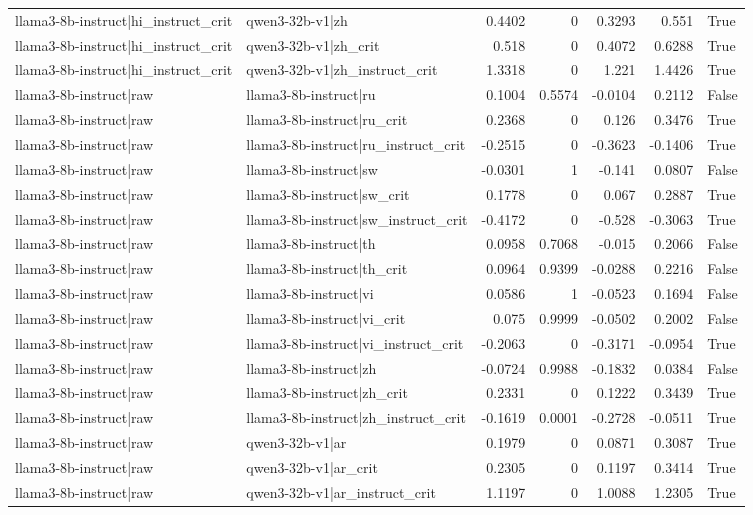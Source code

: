\begin{table}
\begin{tabular}{l l r r r r l}
llama3-8b-instruct|hi_instruct_crit & qwen3-32b-v1|zh & 0.4402 & 0 & 0.3293 & 0.551 & True \\
llama3-8b-instruct|hi_instruct_crit & qwen3-32b-v1|zh_crit & 0.518 & 0 & 0.4072 & 0.6288 & True \\
llama3-8b-instruct|hi_instruct_crit & qwen3-32b-v1|zh_instruct_crit & 1.3318 & 0 & 1.221 & 1.4426 & True \\
llama3-8b-instruct|raw & llama3-8b-instruct|ru & 0.1004 & 0.5574 & -0.0104 & 0.2112 & False \\
llama3-8b-instruct|raw & llama3-8b-instruct|ru_crit & 0.2368 & 0 & 0.126 & 0.3476 & True \\
llama3-8b-instruct|raw & llama3-8b-instruct|ru_instruct_crit & -0.2515 & 0 & -0.3623 & -0.1406 & True \\
llama3-8b-instruct|raw & llama3-8b-instruct|sw & -0.0301 & 1 & -0.141 & 0.0807 & False \\
llama3-8b-instruct|raw & llama3-8b-instruct|sw_crit & 0.1778 & 0 & 0.067 & 0.2887 & True \\
llama3-8b-instruct|raw & llama3-8b-instruct|sw_instruct_crit & -0.4172 & 0 & -0.528 & -0.3063 & True \\
llama3-8b-instruct|raw & llama3-8b-instruct|th & 0.0958 & 0.7068 & -0.015 & 0.2066 & False \\
llama3-8b-instruct|raw & llama3-8b-instruct|th_crit & 0.0964 & 0.9399 & -0.0288 & 0.2216 & False \\
llama3-8b-instruct|raw & llama3-8b-instruct|vi & 0.0586 & 1 & -0.0523 & 0.1694 & False \\
llama3-8b-instruct|raw & llama3-8b-instruct|vi_crit & 0.075 & 0.9999 & -0.0502 & 0.2002 & False \\
llama3-8b-instruct|raw & llama3-8b-instruct|vi_instruct_crit & -0.2063 & 0 & -0.3171 & -0.0954 & True \\
llama3-8b-instruct|raw & llama3-8b-instruct|zh & -0.0724 & 0.9988 & -0.1832 & 0.0384 & False \\
llama3-8b-instruct|raw & llama3-8b-instruct|zh_crit & 0.2331 & 0 & 0.1222 & 0.3439 & True \\
llama3-8b-instruct|raw & llama3-8b-instruct|zh_instruct_crit & -0.1619 & 0.0001 & -0.2728 & -0.0511 & True \\
llama3-8b-instruct|raw & qwen3-32b-v1|ar & 0.1979 & 0 & 0.0871 & 0.3087 & True \\
llama3-8b-instruct|raw & qwen3-32b-v1|ar_crit & 0.2305 & 0 & 0.1197 & 0.3414 & True \\
llama3-8b-instruct|raw & qwen3-32b-v1|ar_instruct_crit & 1.1197 & 0 & 1.0088 & 1.2305 & True \\

\end{tabular}
\end{table}
